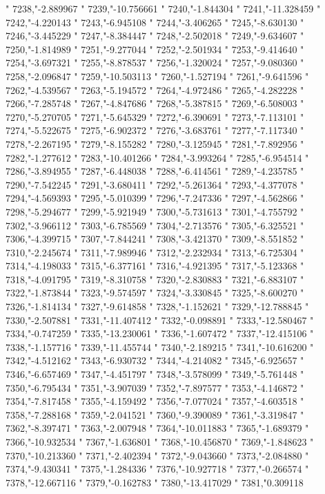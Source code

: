 "
7238,"-2.889967
"
7239,"-10.756661
"
7240,"-1.844304
"
7241,"-11.328459
"
7242,"-4.220143
"
7243,"-6.945108
"
7244,"-3.406265
"
7245,"-8.630130
"
7246,"-3.445229
"
7247,"-8.384447
"
7248,"-2.502018
"
7249,"-9.634607
"
7250,"-1.814989
"
7251,"-9.277044
"
7252,"-2.501934
"
7253,"-9.414640
"
7254,"-3.697321
"
7255,"-8.878537
"
7256,"-1.320024
"
7257,"-9.080360
"
7258,"-2.096847
"
7259,"-10.503113
"
7260,"-1.527194
"
7261,"-9.641596
"
7262,"-4.539567
"
7263,"-5.194572
"
7264,"-4.972486
"
7265,"-4.282228
"
7266,"-7.285748
"
7267,"-4.847686
"
7268,"-5.387815
"
7269,"-6.508003
"
7270,"-5.270705
"
7271,"-5.645329
"
7272,"-6.390691
"
7273,"-7.113101
"
7274,"-5.522675
"
7275,"-6.902372
"
7276,"-3.683761
"
7277,"-7.117340
"
7278,"-2.267195
"
7279,"-8.155282
"
7280,"-3.125945
"
7281,"-7.892956
"
7282,"-1.277612
"
7283,"-10.401266
"
7284,"-3.993264
"
7285,"-6.954514
"
7286,"-3.894955
"
7287,"-6.448038
"
7288,"-6.414561
"
7289,"-4.235785
"
7290,"-7.542245
"
7291,"-3.680411
"
7292,"-5.261364
"
7293,"-4.377078
"
7294,"-4.569393
"
7295,"-5.010399
"
7296,"-7.247336
"
7297,"-4.562866
"
7298,"-5.294677
"
7299,"-5.921949
"
7300,"-5.731613
"
7301,"-4.755792
"
7302,"-3.966112
"
7303,"-6.785569
"
7304,"-2.713576
"
7305,"-6.325521
"
7306,"-4.399715
"
7307,"-7.844241
"
7308,"-3.421370
"
7309,"-8.551852
"
7310,"-2.245674
"
7311,"-7.989946
"
7312,"-2.232934
"
7313,"-6.725304
"
7314,"-4.198033
"
7315,"-6.377161
"
7316,"-4.921395
"
7317,"-5.123368
"
7318,"-4.091795
"
7319,"-8.310758
"
7320,"-2.830883
"
7321,"-6.883107
"
7322,"-1.873844
"
7323,"-9.574597
"
7324,"-3.330845
"
7325,"-8.600270
"
7326,"-1.814134
"
7327,"-9.614858
"
7328,"-1.152621
"
7329,"-12.788845
"
7330,"-2.507881
"
7331,"-11.407412
"
7332,"-0.098891
"
7333,"-12.580467
"
7334,"-0.747259
"
7335,"-13.230061
"
7336,"-1.607472
"
7337,"-12.415106
"
7338,"-1.157716
"
7339,"-11.455744
"
7340,"-2.189215
"
7341,"-10.616200
"
7342,"-4.512162
"
7343,"-6.930732
"
7344,"-4.214082
"
7345,"-6.925657
"
7346,"-6.657469
"
7347,"-4.451797
"
7348,"-3.578099
"
7349,"-5.761448
"
7350,"-6.795434
"
7351,"-3.907039
"
7352,"-7.897577
"
7353,"-4.146872
"
7354,"-7.817458
"
7355,"-4.159492
"
7356,"-7.077024
"
7357,"-4.603518
"
7358,"-7.288168
"
7359,"-2.041521
"
7360,"-9.390089
"
7361,"-3.319847
"
7362,"-8.397471
"
7363,"-2.007948
"
7364,"-10.011883
"
7365,"-1.689379
"
7366,"-10.932534
"
7367,"-1.636801
"
7368,"-10.456870
"
7369,"-1.848623
"
7370,"-10.213360
"
7371,"-2.402394
"
7372,"-9.043660
"
7373,"-2.084880
"
7374,"-9.430341
"
7375,"-1.284336
"
7376,"-10.927718
"
7377,"-0.266574
"
7378,"-12.667116
"
7379,"-0.162783
"
7380,"-13.417029
"
7381,"0.309118
